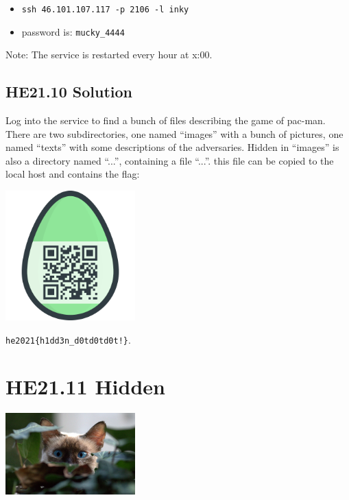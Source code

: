 \documentclass[english,a4paper,nols,noindent]{tufte-handout}
\begin{document}
\begin{itemize}
\item \verb+ssh 46.101.107.117 -p 2106 -l inky+
\item password is: \verb+mucky_4444+
\end{itemize}
Note: The service is restarted every hour at x:00.

\hypertarget{he21.10-solution}{%
\subsection{HE21.10 Solution}\label{he21.10-solution}}

Log into the service to find a bunch of files describing the game of
pac-man.  There are two subdirectories, one named ``images'' with a
bunch of pictures, one named ``texts'' with some descriptions of the
adversaries.  Hidden in ``images'' is also a directory named ``...'',
containing a file ``...''.  this file can be copied to the local host
and contains the flag:

\begin{marginfigure}
    \includegraphics[width=50mm]{ch10/hidden.png}
\end{marginfigure}
\verb+he2021{h1dd3n_d0td0td0t!}+.

\hypertarget{he21.11}{%
\section{HE21.11 Hidden}\label{he21.11}}
\begin{marginfigure}
    \includegraphics[width=50mm]{images/challenge11.jpg}
\end{marginfigure}
\end{document}
